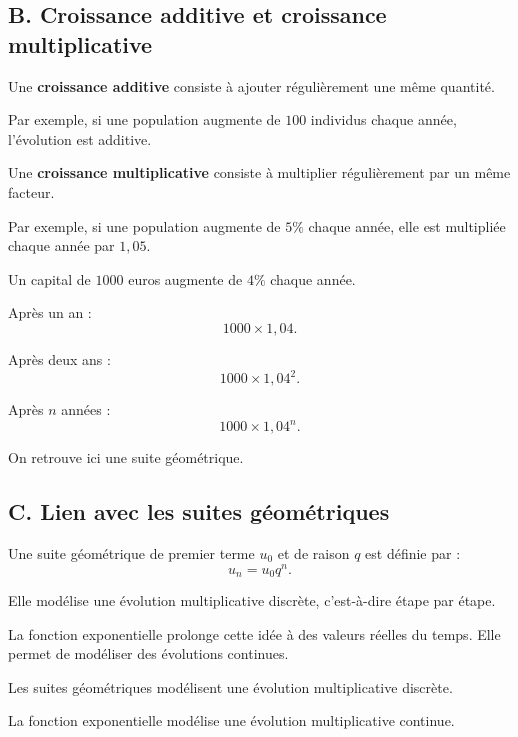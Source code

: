 \documentclass[11pt,a4paper]{article}
\begin{document}
\subsection*{B. Croissance additive et croissance multiplicative}

\begin{definitionbox}
Une \textbf{croissance additive} consiste à ajouter régulièrement une même quantité.

Par exemple, si une population augmente de $100$ individus chaque année, l'évolution est additive.
\end{definitionbox}

\begin{definitionbox}
Une \textbf{croissance multiplicative} consiste à multiplier régulièrement par un même facteur.

Par exemple, si une population augmente de $5\%$ chaque année, elle est multipliée chaque année par $1,05$.
\end{definitionbox}

\begin{exemplebox}
Un capital de $1000$ euros augmente de $4\%$ chaque année.

Après un an :
\[
1000 \times 1,04.
\]

Après deux ans :
\[
1000 \times 1,04^2.
\]

Après $n$ années :
\[
1000 \times 1,04^n.
\]

On retrouve ici une suite géométrique.
\end{exemplebox}

\subsection*{C. Lien avec les suites géométriques}

\begin{propriete}
Une suite géométrique de premier terme $u_0$ et de raison $q$ est définie par :
\[
u_n=u_0q^n.
\]

Elle modélise une évolution multiplicative discrète, c'est-à-dire étape par étape.
\end{propriete}

La fonction exponentielle prolonge cette idée à des valeurs réelles du temps. Elle permet de modéliser des évolutions continues.

\begin{retenir}
Les suites géométriques modélisent une évolution multiplicative discrète.

La fonction exponentielle modélise une évolution multiplicative continue.
\end{retenir}
\end{document}
